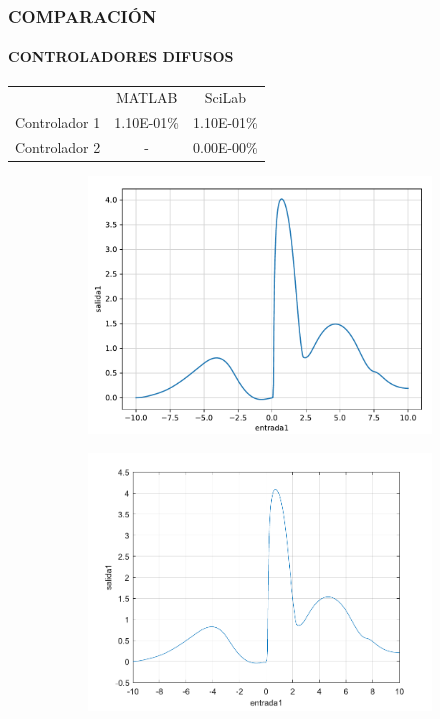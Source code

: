 \documentclass[usenames,xcolor={dvipsnames, table}]{beamer}
\begin{document}
\begin{frame}
	\frametitle{COMPARACIÓN}
	\framesubtitle{CONTROLADORES DIFUSOS}
	\vspace{25pt}
	\begin{table}
		\begin{tabular}{rcc}
						& MATLAB 			& SciLab 			\\
		Controlador 1	& \num{1.10E-01}\%	& \num{1.10E-01}\%	\\
		Controlador 2	& -					& \num{0.00E-00}\%	\\
		\end{tabular}
	\end{table}

	\begin{figure}[htb]
		\centering
		\begin{subfigure}[t]{0.32\textwidth}
			\centering
			\includegraphics[width=\textwidth]{imagenes/LVTomoC1.pdf}
			\caption{}
		\end{subfigure}
		\hfill
		\begin{subfigure}[t]{0.32\textwidth}
			\centering
			\includegraphics[width=\textwidth]{imagenes/MATLABTomoC1.pdf}

\end{subfigure}
\end{figure}
\end{frame}
\end{document}
